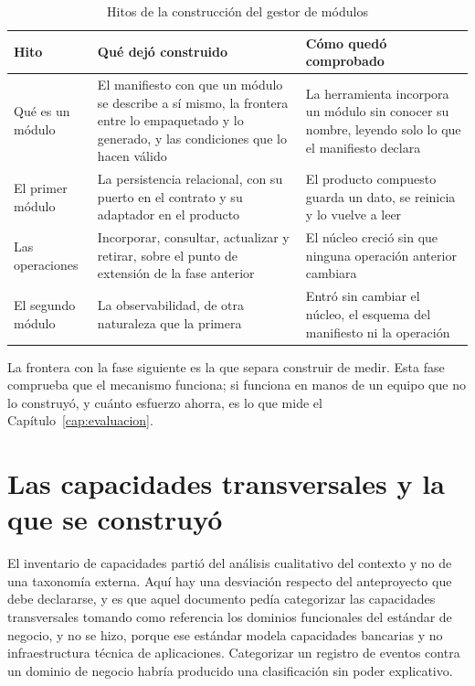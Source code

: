 \begin{table}[H]
\centering
{\footnotesize
\begin{tabular}{p{3.1cm}p{5.9cm}p{5.4cm}}
\toprule
\textbf{Hito} & \textbf{Qué dejó construido} & \textbf{Cómo quedó comprobado} \\
\midrule
Qué es un módulo & El manifiesto con que un módulo se describe a sí mismo, la frontera entre lo empaquetado y lo generado, y las condiciones que lo hacen válido & La herramienta incorpora un módulo sin conocer su nombre, leyendo solo lo que el manifiesto declara \\
El primer módulo & La persistencia relacional, con su puerto en el contrato y su adaptador en el producto & El producto compuesto guarda un dato, se reinicia y lo vuelve a leer \\
Las operaciones & Incorporar, consultar, actualizar y retirar, sobre el punto de extensión de la fase anterior & El núcleo creció sin que ninguna operación anterior cambiara \\
El segundo módulo & La observabilidad, de otra naturaleza que la primera & Entró sin cambiar el núcleo, el esquema del manifiesto ni la operación \\
\bottomrule
\end{tabular}
}
\caption{Hitos de la construcción del gestor de módulos}
\label{tab:hitos-gestor}
\end{table}

La frontera con la fase siguiente es la que separa construir de medir. Esta
fase comprueba que el mecanismo funciona; si funciona en manos de un equipo
que no lo construyó, y cuánto esfuerzo ahorra, es lo que mide el
Capítulo~\ref{cap:evaluacion}.

\section{Las capacidades transversales y la que se construyó}
\label{sec:capacidades-transversales}

El inventario de capacidades partió del análisis cualitativo del contexto y
no de una taxonomía externa. Aquí hay una desviación respecto del
anteproyecto que debe declararse, y es que aquel documento pedía categorizar
las capacidades transversales tomando como referencia los dominios funcionales
del estándar de negocio, y no se hizo, porque ese estándar modela capacidades
bancarias y no infraestructura técnica de aplicaciones. Categorizar un
registro de eventos contra un dominio de negocio habría producido una
clasificación sin poder explicativo.

